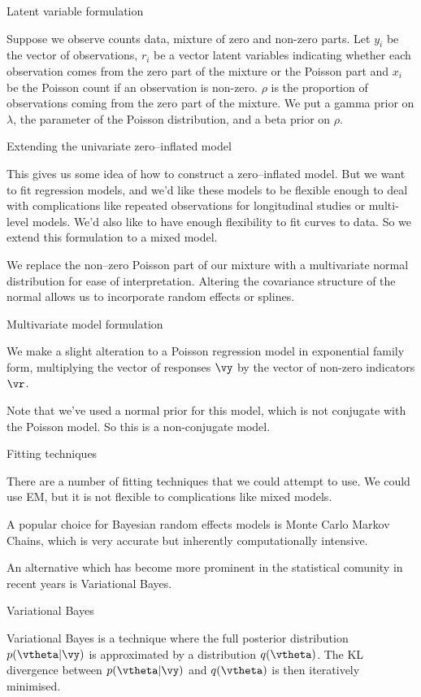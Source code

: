 \documentclass{amsart}
\begin{document}
Latent variable formulation

Suppose we observe counts data, mixture of zero and non-zero parts. Let $y_i$ be the vector of observations,
$r_i$ be a vector latent variables indicating whether each observation comes from the zero part of the mixture
or the Poisson part and $x_i$ be the Poisson count if an observation is non-zero. $\rho$ is the proportion of
observations coming from the zero part of the mixture. We put a gamma prior on $\lambda$, the parameter of the
Poisson distribution, and a beta prior on $\rho$.

Extending the univariate zero--inflated model

This gives us some idea of how to construct a zero--inflated model. But we want to fit regression models, and
we'd like these models to be flexible enough to deal with complications like repeated observations for
longitudinal studies or multi-level models. We'd also like to have enough flexibility to fit curves to data. So
we extend this formulation to a mixed model.

We replace the non--zero Poisson part of our mixture with a multivariate normal distribution for ease of
interpretation. Altering the covariance structure of the normal allows us to incorporate random effects or
splines.

Multivariate model formulation

We make a slight alteration to a Poisson regression model in exponential family form, multiplying the vector
of responses $\vy$ by the vector of non-zero indicators $\vr$.

Note that we've used a normal prior for this model, which is not conjugate with the Poisson model. So this is
a non-conjugate model.

Fitting techniques

There are a number of fitting techniques that we could attempt to use. We could use EM, but it is not flexible
to complications like mixed models.

A popular choice for Bayesian random effects models is Monte Carlo Markov Chains, which is very accurate but inherently computationally intensive.

An alternative which has become more prominent in the statistical comunity in recent years is Variational
Bayes.

Variational Bayes

Variational Bayes is a technique where the full posterior distribution $p(\vtheta | \vy)$ is approximated
by a distribution $q(\vtheta)$. The KL divergence between $p(\vtheta | \vy)$ and $q(\vtheta)$ is then
iteratively minimised.
\end{document}
